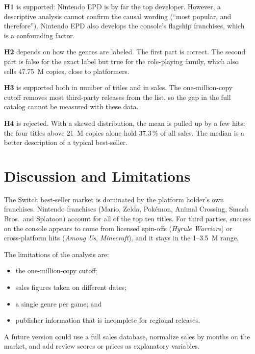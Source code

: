 \documentclass[conference]{IEEEtran}
\begin{document}
\textbf{H1} is supported: Nintendo EPD is by far the top developer. However, a descriptive analysis cannot confirm the causal wording (``most popular, and therefore''). Nintendo EPD also develops the console's flagship franchises, which is a confounding factor.

\textbf{H2} depends on how the genres are labeled. The first part is correct. The second part is false for the exact label but true for the role-playing family, which also sells 47.75~M copies, close to platformers.

\textbf{H3} is supported both in number of titles and in sales. The one-million-copy cutoff removes most third-party releases from the list, so the gap in the full catalog cannot be measured with these data.

\textbf{H4} is rejected. With a skewed distribution, the mean is pulled up by a few hits: the four titles above 21~M copies alone hold 37.3\,\% of all sales. The median is a better description of a typical best-seller.

\section{Discussion and Limitations}
The Switch best-seller market is dominated by the platform holder's own franchises. Nintendo franchises (Mario, Zelda, Pokémon, Animal Crossing, Smash Bros.\ and Splatoon) account for all of the top ten titles. For third parties, success on the console appears to come from licensed spin-offs (\emph{Hyrule Warriors}) or cross-platform hits (\emph{Among Us}, \emph{Minecraft}), and it stays in the 1--3.5~M range.

The limitations of the analysis are:
\begin{itemize}
  \item the one-million-copy cutoff;
  \item sales figures taken on different dates;
  \item a single genre per game; and
  \item publisher information that is incomplete for regional releases.
\end{itemize}
A future version could use a full sales database, normalize sales by months on the market, and add review scores or prices as explanatory variables.
\end{document}
